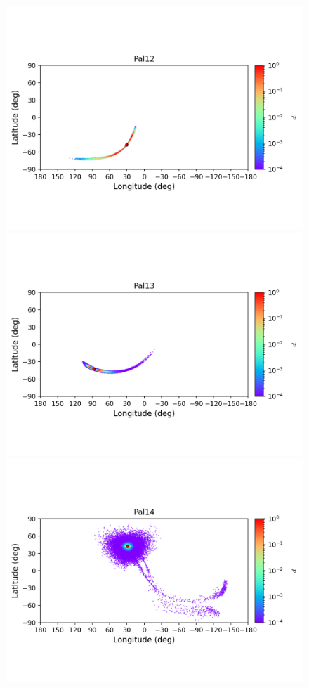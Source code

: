 \begin{figure}
        \includegraphics[clip=true, trim = 0mm 20mm 0mm 10mm, width=1\columnwidth]{images/error_plots_Pal12.png}
        \includegraphics[clip=true, trim = 0mm 20mm 0mm 10mm, width=1\columnwidth]{images/error_plots_Pal13.png}
        \includegraphics[clip=true, trim = 0mm 20mm 0mm 10mm, width=1\columnwidth]{images/error_plots_Pal14.png}

\end{figure}
